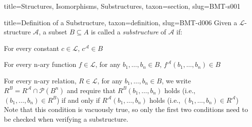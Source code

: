 \documentclass[a4paper]{article}
\begin{document}
\begin{tree}{title={Structures, Isomorphisms, Substructures}, taxon={section}, slug={BMT-s001}}
\begin{tree}{title={Definition of a Substructure}, taxon={definition}, slug={BMT-d006}}
Given a \(\mathcal {L}\)-structure \(\mathcal {A}\), a subset \(B  \subseteq  A\) is called a \emph{substructure} of \(\mathcal {A}\) if:\par{For every constant \(c \in   \mathcal {L}\), \(c^{ \mathcal {A}}  \in  B\)}\par{For every n-ary function \(f \in   \mathcal {L}\), for any \(b_1, \dots , b_n  \in  B\), \(f^{ \mathcal {A}}(b_1, \dots ,b_n)  \in  B\)}\par{For every n-ary relation, \(R \in   \mathcal {L}\), for any \(b_1, \dots , b_n  \in  B\), we write \(R^B = R^{ \mathcal {A}} \cap   \mathcal {P}(B^n)\) and require that
\(R^{B}(b_1, \dots , b_n)\) holds (i.e., \((b_1, \dots , b_n)  \in  R^{B}\))  if and only if \(R^{ \mathcal {A}}(b_1, \dots , b_n)\) holds (i.e., \((b_1, \dots , b_n)  \in  R^{ \mathcal {A}}\)) 
Note that this condition is vacuously true, so only the first two conditions need to be checked when verifying a substructure.}
\end{tree}

\end{tree}
\end{document}
